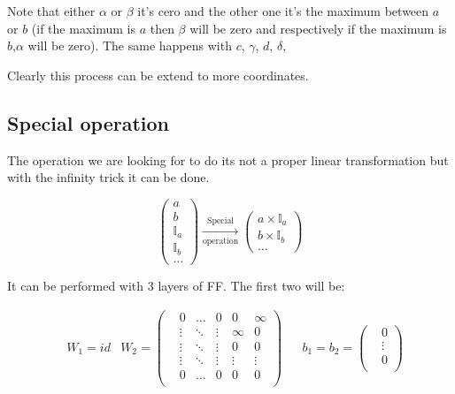 Note that either $\alpha$ or $\beta$ it's cero and the other one it's the maximum between $a$ or $b$ (if the maximum is $a$ then $\beta$ will be zero and respectively if the maximum is $b$,$\alpha$ will be zero). The same happens with $c$, $\gamma$, $d$, $\delta$, 

Clearly this process can be extend to more coordinates.

\subsection*{Special operation}

The operation we are looking for to do its not a proper linear transformation but with the infinity trick it can be done.


\begin{equation*}
    \left(\begin{matrix}
        a \\ b \\ \mathbb{I}_a \\ \mathbb{I}_b \\ \dots
    \end{matrix}\right)
    \xrightarrow[\text{operation}]{\text{Special}}
    \left(\begin{matrix}
        a \times \mathbb{I}_a \\ b \times \mathbb{I}_b\\ \dots
    \end{matrix}\right)
\end{equation*}

It can be performed with 3 layers of FF. The first two will be:

\begin{align*}
    & W_1 = id
    & W_2  = \left(\begin{matrix}
        & 0         &\dots  &0      & 0         & \infty    \\
        & \vdots    &\ddots &\vdots & \infty    & 0         \\
        & \vdots    &\ddots &\vdots & 0         & 0         \\
        & \vdots    &\ddots &\vdots & \vdots    & \vdots    \\
        & 0         &\dots  &0      & 0         & 0         \\
    \end{matrix}\right) &
    & b_1 = b_2 = \left(\begin{matrix}
        & 0      \\
        & \vdots \\
        & 0      \\
    \end{matrix}\right) 
\end{align*}

